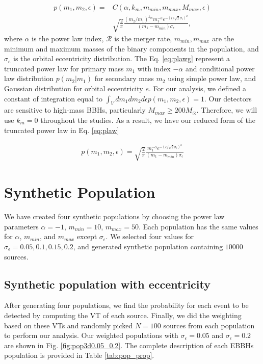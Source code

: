 \documentclass[twocolumn,prd,nofootinbib]{revtex4}
\begin{document}
\begin{align}
\label{eq:plawg}
p(m_1,m_2,\epsilon) = &C(\alpha,k_m,m_{min},m_{max},M_{max},\epsilon)  
\nonumber \\ & \sqrt{\frac{2}{\pi}} \frac{(m_2/m_1)^{k_m} m_1^{-\alpha} e^{-(\epsilon/\sqrt{2}\sigma_\epsilon)^2}}{(m_1-m_{min})\sigma_\epsilon},
\end{align}
%
where $\alpha$ is the power law index, $\mathcal{R}$ is the merger rate, $m_{min}, m_{max}$ are the minimum and maximum masses of the binary components in the population, and $\sigma_e$ is the orbital eccentricity distribution. The Eq. \ref{eq:plawg} represent a truncated power law for primary mass $m_1$ with index $-\alpha$ and conditional power law distribution $p(m_2|m_1)$ for secondary mass $m_2$ using simple power law, and Gaussian distribution for orbital eccentricity $e$. 
For our analysis, we defined a constant of integration equal to $\int_V dm_1 dm_2 d\epsilon p(m_1,m_2,\epsilon) = 1$.  Our detectors are sensitive to high-mass BBHs, particularly $M_{max}\geq 200 M_\odot$. Therefore, we will use $k_m=0$ throughout the studies. As a result, we have our reduced form of the truncated power law in Eq. \ref{eq:plaw}

\begin{align}
\label{eq:plaw}
p(m_1,m_2,\epsilon) = \sqrt{\frac{2}{\pi}} \frac{ m_1^{-\alpha}  e^{-(\epsilon/\sqrt{2}\sigma_\epsilon)^2}}{(m_1-m_{min})\sigma_\epsilon}
\end{align}

\section{Synthetic Population}
\label{sec:syn_pop}
We have created four synthetic populations by choosing the power law parameters $\alpha = -1$, $m_{min} = 10$, $m_{max}=50$. Each population has the same values for $\alpha$, $m_{min}$, and $m_{max}$ except $\sigma_\epsilon$. We selected four values for $\sigma_\epsilon = 0.05, 0.1, 0.15, 0.2$, and  generated synthetic population containing $10000$ sources.

\subsection{Synthetic population with eccentricity}

After generating four populations, we find the probability for each event to be detected by computing the VT of each source. Finally, we did the weighting based on these VTs and randomly picked $N=100$ sources from each population to perform our analysis. Our weighted populations with $\sigma_\epsilon=0.05$ and $\sigma_\epsilon=0.2$ are shown in Fig. \ref{fig:pop3d0.05_0.2}.  The complete description of each EBBHs population is provided in Table \ref{tab:pop_prop}.
\end{document}

